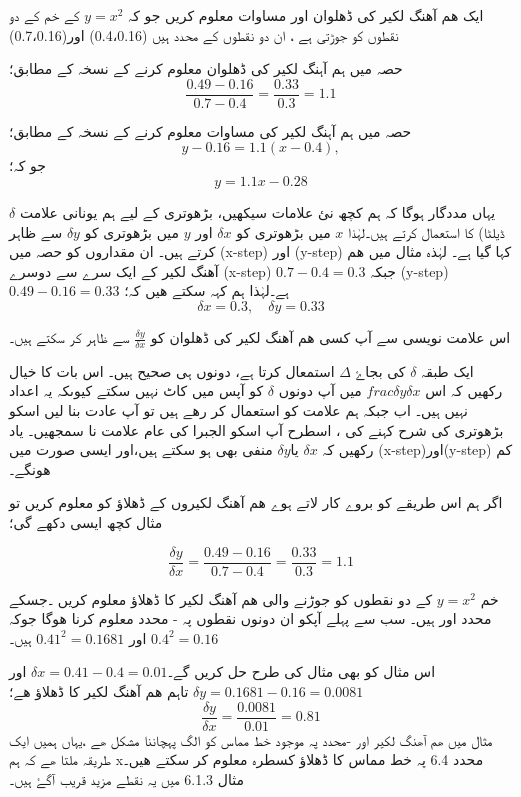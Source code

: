 ایک ھم آھنگ لکیر کی ڈھلوان اور مساوات معلوم کریں جو کہ \( y=x^{2}\) کے خم کے دو نقطوں کو جوڑتی ہے ، ان دو نقطوں کے محدد ہیں (0.4،0.16) اور(0.7،0.16)

حصہ  میں ہم آہنگ لکیر کی ڈھلوان معلوم کرنے کے نسخہ کے مطابق؛
\[ \frac{0.49-0.16}{0.7-0.4} = \frac{0.33}{0.3} = 1.1\]

حصہ  میں ہم آہنگ لکیر کی مساوات معلوم کرنے کے نسخہ کے مطابق؛
\[ y-0.16 = 1.1(x-0.4), \]
جو کہ؛
\[ y=1.1x-0.28\]

 

یہاں مددگار ہوگا کہ ہم کچھ نئ علامات سیکھیں، بڑھوتری کے لیے ہم یونانی علامت \( \delta\)ڈیلٹا) کا استعمال کرتے ہیں۔لہٰذا \(x\)  میں بڑھوتری کو        \(\delta x\)    اور          \(y\)  میں بڑھوتری کو          \(\delta y\) سے ظاہر کرتے ہیں۔ ان مقداروں کو حصہ  میں (x-step) اور (y-step) کہا گیا ہے۔ لہٰذہ مثال  میں ھم آھنگ لکیر کے ایک سرے سے دوسرے (x-step)    \( 0.7-0.4=0.3\) جبکہ (y-step) \(0.49-0.16=0.33\) ہے۔لہٰذا ہم کہہ سکتے ھیں کہ؛
\[ \delta x = 0.3 ,\quad \delta y =0.33\]

اس علامت نویسی سے آپ کسی ھم آھنگ لکیر کی ڈھلوان کو \( \frac{\delta y}{\delta x}\) سے ظاہر کر سکتے ہیں۔ 

ایک طبقہ  \( \delta\) کی بجاۓ                 \( \Delta \)             استمعال کرتا ہے، دونوں ہی صحیح ہیں۔   
اس بات کا خیال رکھیں کہ اس \(frac{\delta y}{\delta x}\) میں آپ دونوں \(\delta\) کو آپس میں کاٹ نہیں سکتے کیوںکہ یہ اعداد نہیں ہیں۔
اب جبکہ ہم علامت کو استعمال کر رھے ہیں تو آپ عادت بنا لیں اسکو بڑھوتری کی شرح کہنے کی ، اسطرح آپ اسکو الجبرا کی عام علامت نا سمجھیں۔ یاد رکھیں کہ \(\delta x\) یا\(\delta y\)  منفی بھی ہو سکتے ہیں،اور ایسی صورت میں (x-step)اور(y-step) کم ھونگے۔
 
اگر ہم اس طریقے کو بروے کار لاتے ہوے ھم آھنگ لکیروں کے ڈھلاؤ کو معلوم کریں تو مثال   کچھ ایسی دکھے گی؛

\[ \frac{\delta y}{\delta x} = \frac{0.49-0.16}{0.7-0.4}=\frac{0.33}{0.3}=1.1 \]

خم \( y=x^{2}\) کے دو نقطوں کو جوڑنے والی ھم آھنگ لکیر کا ڈھلاؤ معلوم کریں ۔جسکے     محدد    اور   ہیں۔
سب سے پہلے آپکو ان دونوں نقطوں پہ   -    
محدد معلوم کرنا ھوگا  جوکہ \( 0.4^{2}=0.16\)  اور \( 0.41^{2} =0.1681\) ہیں۔



 اس مثال کو بھی مثال  کی طرح حل کریں گے۔\( \delta x = 0.41-0.4=0.01\)  اور   \(\delta y =0.1681-0.16=0.0081\)
تاہم ھم آھنگ لکیر کا ڈھلاؤ ھے؛
\[ \frac{\delta y}{\delta x} =\frac{0.0081}{0.01}=0.81\]
مثال   میں  ھم آھنگ لکیر اور -محدد  پہ موجود خط مماس کو الگ پہچاننا  مشکل ھے ،یہاں ہمیں ایک طریقہ ملتا ھے کہ ہم  xمحدد 6.4 پہ خط مماس کا ڈھلاؤ کسطرہ معلوم کر سکتے ھیں۔ 
مثال 6.1.3 میں یہ نقطے مزید قریب آگۓ ہیں۔

